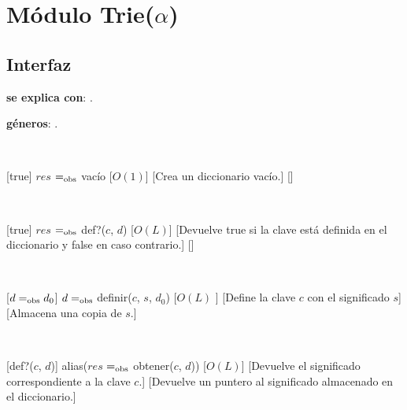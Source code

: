 \section{Módulo Trie($\alpha$)}

\subsection{Interfaz}

  \textbf{se explica con}: .

  \textbf{géneros}: .

  ~

  [true]
  {$res$ $=_{\mathrm{obs}}$ vacío}
  [$O(1)$]
  [Crea un diccionario vacío.]
  []

  ~

  [true]
	{$res$ $=_{\mathrm{obs}}$ def?($c$, $d$)}
	[$O(L)$]
	[Devuelve true si la clave está definida en el diccionario y false en caso contrario.]
	[]

  ~

  [$ d =_{\mathrm{obs}} d_0 $]
  {$ d =_{\mathrm{obs}}$ definir($c$, $s$, $d_0$)}
  [$O(L)$ ]
  [Define la clave $c$ con el significado $s$]
  [Almacena una copia de $s$.]

  ~

  [def?($c$, $d$)]
  {alias($res$ $=_{\mathrm{obs}}$ obtener($c$, $d$))}
  [$O(L)$]
  [Devuelve el significado correspondiente a la clave $c$.]
  [Devuelve un puntero al significado almacenado en el diccionario.]
